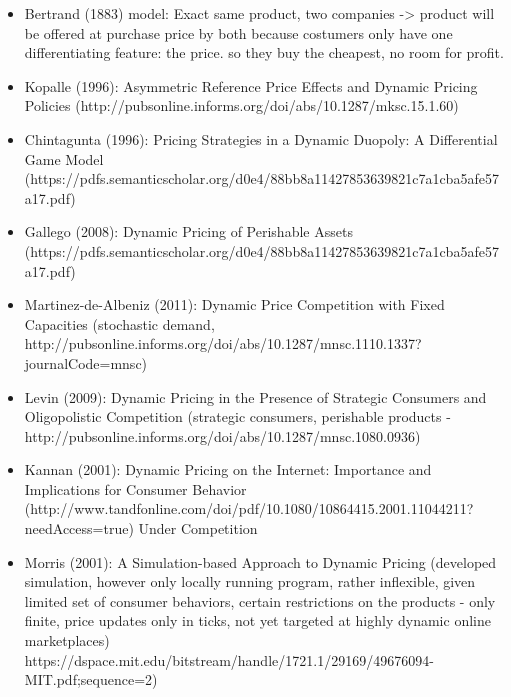 \iffalse

\begin{itemize}
    \item Bertrand (1883) model: Exact same product, two companies -> product will be offered at purchase price by both because costumers only have one differentiating feature: the price. so they buy the cheapest, no room for profit.
    
    \item Kopalle (1996): Asymmetric Reference Price Effects and Dynamic Pricing Policies  (http://pubsonline.informs.org/doi/abs/10.1287/mksc.15.1.60)
    \item Chintagunta (1996): Pricing Strategies in a Dynamic Duopoly: A Differential Game Model (https://pdfs.semanticscholar.org/d0e4/88bb8a11427853639821c7a1cba5afe57a17.pdf)
    
    \item Gallego (2008): Dynamic Pricing of Perishable Assets (https://pdfs.semanticscholar.org/d0e4/88bb8a11427853639821c7a1cba5afe57a17.pdf)
    
     \item Martinez-de-Albeniz (2011): Dynamic Price Competition with Fixed Capacities (stochastic demand, http://pubsonline.informs.org/doi/abs/10.1287/mnsc.1110.1337?journalCode=mnsc)
    
    \item Levin (2009): Dynamic Pricing in the Presence of Strategic Consumers and Oligopolistic Competition (strategic consumers, perishable products - http://pubsonline.informs.org/doi/abs/10.1287/mnsc.1080.0936)
    
   
    \item Kannan (2001): Dynamic Pricing on the Internet: Importance and
Implications for Consumer Behavior (http://www.tandfonline.com/doi/pdf/10.1080/10864415.2001.11044211?needAccess=true)
Under Competition

    \item Morris (2001): A Simulation-based Approach to Dynamic Pricing  (developed simulation, however only locally running program, rather inflexible, given limited set of consumer behaviors, certain restrictions on the products - only finite, price updates only in ticks, not yet targeted at highly dynamic online marketplaces) https://dspace.mit.edu/bitstream/handle/1721.1/29169/49676094-MIT.pdf;sequence=2) 
\end{itemize}


